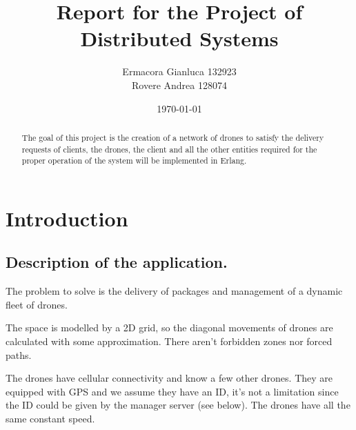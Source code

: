 \documentclass[a4paper, oneside]{memoir}
\title{Report for the Project of Distributed Systems}
\author{Ermacora Gianluca 132923\\ Rovere Andrea 128074}
\date{\today}
\begin{document}
\begin{titlingpage}
\maketitle
\begin{abstract}
The goal of this project is the creation of a network of drones to satisfy the delivery requests of clients, the drones, the client and all the other entities required for the proper operation of the system will be implemented in Erlang.
\end{abstract}
\end{titlingpage}

\chapter{Introduction}\label{ch:intro}


\section{Description of the application.}
The problem to solve is the delivery of packages and management of a dynamic fleet of drones.

The space is modelled by a 2D grid, so the diagonal movements of drones are calculated with some approximation. There aren't forbidden zones nor forced paths.

The drones have cellular connectivity and know a few other drones. They are equipped with GPS and we assume they have an ID, it's not a limitation since the ID could be given by the manager server (see below). The drones have all the same constant speed.
\end{document}
